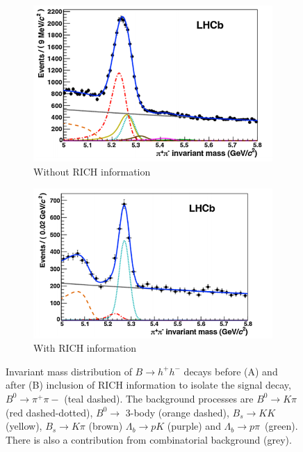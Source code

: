 \begin{figure}[htbp]
	\begin{center}
		\begin{subfigure}[b]{0.49\textwidth}
			\includegraphics[width=\textwidth]{./Chapters/detector/rich/inv_mass_b_to_hh_no_rich.png}
			\caption{Without RICH information}
			\label{fig: inv_mass_b_to_hh_no_rich.png}
		\end{subfigure}
		\begin{subfigure}[b]{0.49\textwidth}
			\includegraphics[width=\textwidth]{./Chapters/detector/rich/inv_mass_b_to_hh_with_rich.png}
			\caption{With RICH information}
			\label{fig: inv_mass_b_to_hh_with_rich.png}
		\end{subfigure}
		\caption{Invariant mass distribution of $B\rightarrow h^+h^-$ decays before (A) and after (B) inclusion of RICH information to isolate the signal decay, $B^0 \rightarrow \pi^+\pi-$ (teal dashed). The background processes are $B^0\rightarrow K\pi$ (red dashed-dotted), $B^0 \rightarrow$ 3-body (orange dashed), $B_s \rightarrow KK$ (yellow), $B_s \rightarrow K\pi$ (brown) $\Lambda_b \rightarrow pK$ (purple) and $\Lambda_b \rightarrow p\pi$~(green). There is also a contribution from combinatorial background (grey).}
		\label{fig: inv_mass_b_to_hh}
	\end{center}
\end{figure}

